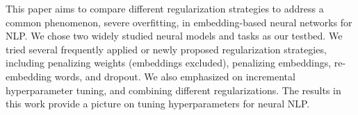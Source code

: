This paper aims to compare different regularization strategies to address a common phenomenon, severe overfitting, in embedding-based neural networks for NLP. We chose two widely studied neural models and tasks as our testbed. We tried several frequently applied or newly proposed regularization strategies, including penalizing weights (embeddings excluded), penalizing embeddings, re-embedding words, and dropout. We also emphasized on incremental hyperparameter tuning, and combining different regularizations. The results in this work provide a picture on tuning hyperparameters for neural NLP.
